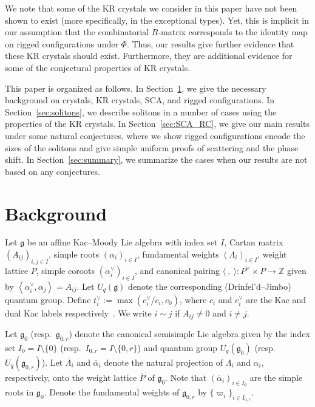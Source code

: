 \documentclass[reqno]{amsart}
\newcommand{\g}{\mathfrak{g}}
\newcommand{\clfw}{\overline{\Lambda}} %
\newcommand{\clsr}{\overline{\alpha}} %
\newcommand{\inner}[2]{\left\langle #1, #2 \right\rangle}
\newcommand{\ZZ}{\mathbb{Z}}
\theoremstyle{plain}
\theoremstyle{definition}
\numberwithin{equation}{section}
\begin{document}
We note that some of the KR crystals we consider in this paper have not been shown to exist (more specifically, in the exceptional types).
Yet, this is implicit in our assumption that the combinatorial $R$-matrix corresponds to the identity map on rigged configurations under $\Phi$.
Thus, our results give further evidence that these KR crystals should exist.
Furthermore, they are additional evidence for some of the conjectural properties of KR crystals.

This paper is organized as follows.
In Section~\ref{sec:background}, we give the necessary background on crystals, KR crystals, SCA, and rigged configurations.
In Section~\ref{sec:solitons}, we describe solitons in a number of cases using the properties of the KR crystals.
In Section~\ref{sec:SCA_RC}, we give our main results under some natural conjectures, where we show rigged configurations encode the sizes of the solitons and give simple uniform proofs of scattering and the phase shift.
In Section~\ref{sec:summary}, we summarize the cases when our results are not based on any conjectures.





\section{Background}
\label{sec:background}

Let $\g$ be an affine Kac--Moody Lie algebra with index set $I$, Cartan matrix $(A_{ij})_{i,j \in I}$, simple roots $(\alpha_i)_{i \in I}$, fundamental weights $(\Lambda_i)_{i \in I}$, weight lattice $P$, simple coroots $(\alpha_i^{\vee})_{i \in I}$, and canonical pairing $\langle\ ,\ \rangle \colon P^{\vee} \times P \to \ZZ$ given by $\inner{\alpha_i^{\vee}}{\alpha_j} = A_{ij}$.
Let $U_q(\g)$ denote the corresponding (Drinfel'd--Jimbo) quantum group.
Define $t_i^{\vee} := \max(c_i^{\vee}/c_i, c_0)$, where $c_i$ and $c_i^{\vee}$ are the Kac and dual Kac labels respectively~\cite[Table Aff1-3]{kac90}.
We write $i \sim j$ if $A_{ij} \neq 0$ and $i \neq j$.

Let $\g_0$ (resp.~$\g_{0,r}$) denote the canonical semisimple Lie algebra given by the index set $I_0 = I \setminus \{0\}$ (resp.~$I_{0,r} = I \setminus \{0,r\}$) and quantum group $U_q(\g_0)$ (resp.~$U_q(\g_{0,r})$).
Let $\clfw_i$ and $\clsr_i$ denote the natural projection of $\Lambda_i$ and $\alpha_i$, respectively, onto the weight lattice $\overline{P}$ of $\g_0$.
Note that $(\clsr_i)_{i \in I_0}$ are the simple roots in $\g_0$.
Denote the fundamental weights of $\g_{0,r}$ by $\{\varpi_i\}_{i \in I_{0,r}}$.
\end{document}
